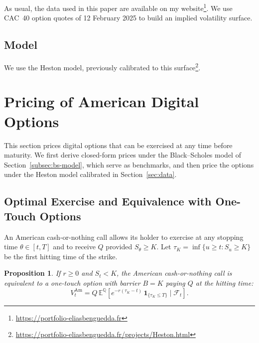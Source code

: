 \documentclass[11pt,a4paper]{article}
\newtheorem{proposition}{Proposition}[section]
\theoremstyle{remark}
\begin{document}
As usual, the data used in this paper are available on my
website\footnote{\url{https://portfolio-eliasbenguedda.fr}}. We use CAC~40
option quotes of 12 February 2025 to build an implied volatility surface.

\subsection{Model}

We use the Heston model, previously calibrated to this
surface\footnote{\url{https://portfolio-eliasbenguedda.fr/projects/Heston.html}}.

\section{Pricing of American Digital Options}
\label{sec:american}

This section prices digital options that can be exercised at any time before
maturity. We first derive closed-form prices under the Black--Scholes model of
Section~\ref{subsec:bs-model}, which serve as benchmarks, and then price the
options under the Heston model calibrated in Section~\ref{sec:data}.

\subsection{Optimal Exercise and Equivalence with One-Touch Options}

An American cash-or-nothing call allows its holder to exercise at any stopping
time $\theta \in [t,T]$ and to receive $Q$ provided $S_\theta \geq K$. Let
$\tau_K = \inf\{u \geq t : S_u \geq K\}$ be the first hitting time of the
strike.

\begin{proposition}
\label{prop:american-one-touch}
If $r \geq 0$ and $S_t < K$, the American cash-or-nothing call is equivalent
to a one-touch option with barrier $B = K$ paying $Q$ at the hitting time:
\begin{equation}
  V^{\mathrm{Am}}_t = Q\,\mathbb{E}^{\mathbb{Q}}\!\left[e^{-r(\tau_K - t)}\,\mathbf{1}_{\{\tau_K \leq T\}} \mid \mathcal{F}_t\right].
  \label{eq:american-one-touch}
\end{equation}
\end{proposition}
\end{document}
